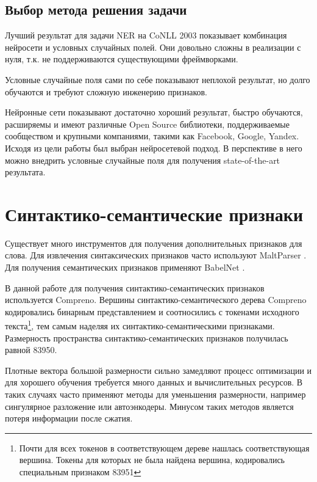     \subsection{Выбор метода решения задачи}

      Лучший результат для задачи NER на CoNLL 2003 показывает комбинация нейросети и
      условных случайных полей. Они довольно сложны в реализации с нуля, т.к. не поддерживаются
      существующими фреймворками.

      Условные случайные поля сами по себе показывают неплохой
      результат, но долго обучаются и требуют сложную инженерию признаков.

      Нейронные сети показывают достаточно хороший результат, быстро обучаются,
      расширяемы и
      имеют различные Open Source библиотеки, поддерживаемые сообществом и крупными
      компаниями, такими как Facebook, Google, Yandex.
      Исходя из цели работы был выбран нейросетевой подход. В перспективе в него
      можно внедрить условные случайные поля для получения state-of-the-art результата.

  \section{Синтактико-семантические признаки}
    Существует много инструментов для получения дополнительных признаков для слова.
    Для извлечения синтаксических признаков часто используют MaltParser \citep{nivre2006maltparser}.
    Для получения семантических признаков применяют BabelNet \citep{navigli2010babelnet}.

    В данной работе для получения синтактико-семантических признаков используется Compreno.
    Вершины синтактико-семантического дерева Compreno кодировались бинарным представлением
    и соотносились с токенами исходного
    текста\footnote{Почти для всех токенов в соответствующем дереве нашлась соответствующая вершина.
    Токены для которых не была найдена вершина, кодировались специальным признаком 83951},
    тем самым наделяя их синтактико-се\-ман\-ти\-ческими признаками.
    Размерность пространства синтактико-се\-ман\-ти\-ческих признаков получилась равной 83950.

    Плотные вектора большой размерности сильно замедляют процесс оптимизации и для хорошего
    обучения требуется много данных и вычислительных ресурсов.
    В таких случаях часто применяют методы для уменьшения размерности,
    например сингулярное разложение или автоэнкодеры. Минусом таких методов является потеря информации
    после сжатия.

